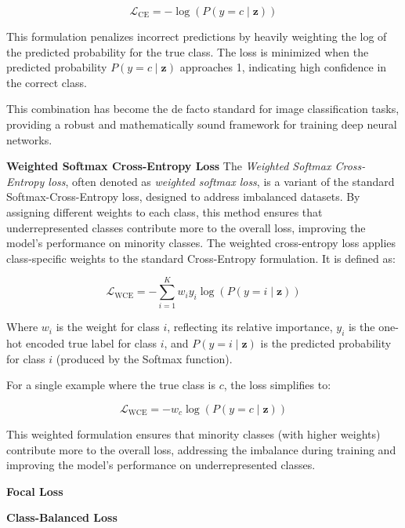 \begin{equation}
    \mathcal{L}_{\text{CE}} = -\log(P(y = c \mid \mathbf{z}))
\end{equation}


This formulation penalizes incorrect predictions by heavily weighting the log of the predicted probability for the true class. The loss is minimized when the predicted probability \( P(y = c \mid \mathbf{z}) \) approaches 1, indicating high confidence in the correct class.

This combination has become the de facto standard for image classification tasks, providing a robust and mathematically sound framework for training deep neural networks.


\myindent \textbf{Weighted Softmax Cross-Entropy Loss}
The \textit{Weighted Softmax Cross-Entropy loss}, often denoted as \textit{weighted softmax loss}, is a variant of the standard Softmax-Cross-Entropy loss, designed to address imbalanced datasets. By assigning different weights to each class, this method ensures that underrepresented classes contribute more to the overall loss, improving the model's performance on minority classes. The weighted cross-entropy loss applies class-specific weights to the standard Cross-Entropy formulation. It is defined as:

\begin{equation}
    \mathcal{L}_{\text{WCE}} = -\sum_{i=1}^{K} w_i y_i \log(P(y = i \mid \mathbf{z}))
\end{equation}

Where \( w_i \) is the weight for class \( i \), reflecting its relative importance, \( y_i \) is the one-hot encoded true label for class \( i \), and \( P(y = i \mid \mathbf{z}) \) is the predicted probability for class \( i \) (produced by the Softmax function).

For a single example where the true class is \( c \), the loss simplifies to:

\begin{equation}
    \mathcal{L}_{\text{WCE}} = -w_c \log(P(y = c \mid \mathbf{z}))
\end{equation}

This weighted formulation ensures that minority classes (with higher weights) contribute more to the overall loss, addressing the imbalance during training and improving the model's performance on underrepresented classes.

\myindent \textbf{Focal Loss}

\myindent \textbf{Class-Balanced Loss}

